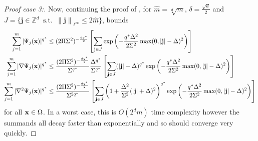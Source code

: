 \documentclass[10pt,a4paper,onecolumn]{article}
\numberwithin{equation}{section}
\let\F\mathds\let\C\mathcal\newcommand{\R}{\F{R}}\newcommand{\A}{\C{A}}
\newcommand{\norm}[1]{{\left\lVert #1 \right\rVert}}
\DeclareMathOperator{\st}{\;s.t.\;}\DeclareMathOperator{\as}{\;a.s.\;}\renewcommand{\epsilon}{\varepsilon}
\renewcommand{\vec}{\mathbf}
\newcommand{\UCmath}[1]{%
	\begingroup
	\ucmathlist\uppercase\expandafter{#1}%
	\endgroup
}
\newcommand{\ucmathlist}{%
	\def\alpha{\mathrm{A}}%
	\def\beta{\mathrm{B}}%
	\let\gamma=\Gamma
	\let\delta=\Delta
	\def\epsilon{\mathrm{E}}%
	\def\varepsilon{\mathrm{E}}%
	\def\zeta{\mathrm{Z}}%
	\def\eta{\mathrm{H}}%
	\let\theta=\Theta
	\let\vartheta=\Theta
	\def\iota{\mathrm{I}}%
	\def\kappa{\mathrm{K}}%
	\let\lambda=\Lambda
	\def\mu{\mathrm{M}}%
	\def\nu{\mathrm{N}}%
	\let\xi=\Xi
	\let\pi=\Pi
	\let\varpi=\Pi
	\def\rho{\mathrm{P}}%
	\def\varrho{\mathrm{P}}%
	\let\sigma=\Sigma
	\def\tau{\mathrm{T}}%
	\let\upsilon=\Upsilon
	\let\phi=\Phi
	\let\varphi=\Phi
	\def\chi{\mathrm{X}}%
	\let\psi=\Psi
	\let\omega=\Omega
}
\newcommand{\caps}[1]{\UCmath{#1}}
\newcommand*{\vard}[1]{%
	\IfEqCase{#1}{%
		{0}{\varphi}%
		{1}{\psi}%
	}[\varphi #1]%
}
\newcommand*{\varx}[1]{%
	\IfEqCase{#1}{%
		{0}{x}%
		{1}{y}%
		{2}{z}%
		{3}{r}%
	}[x#1]%
}
\newcommand{\Domain}{\Omega}
\newcommand*{\Varx}[1]{\caps{\varx{#1}}}
\newcommand*{\vvarx}[1]{\vec{\varx{#1}}}\newcommand*{\vVarx}[1]{\vec{\Varx{#1}}}
\begin{document}
\begin{proof}[Proof case 3:]
	Now, continuing the proof of , for $\hat m=\sqrt[d]{m}$, $\delta=\frac{\sqrt{d}}{2}$ and $J=\{\vec{j}\in\F Z^d \st \norm{\vec{j}}_{\ell^\infty}\leq 2\hat m\}$,  bounds 
	\begin{align*}
		\sum_{j=1}^m |\vard1_j(\vvarx0)|^{q^*} &\leq (2\pi\sigma^2)^{-\frac{dq^*}{2}} \left[\sum_{\vec{j}\in J} \exp\left(-\frac{q^*\Delta^2}{2\sigma^2}\max(0,|\vec{j}|-\delta)^2\right)\right]
		\\\sum_{j=1}^m |\nabla\vard1_j(\vvarx0)|^{q^*} &\leq \frac{(2\pi\sigma^2)^{-\frac{dq^*}{2}}}{\sigma^{q^*}}\frac{\Delta^{q^*}}{\sigma^{q^*}} \left[\sum_{\vec{j}\in J} (|\vec{j}|+\delta)^{q^*}\exp\left(-\frac{q^*\Delta^2}{2\sigma^2}\max(0,|\vec{j}|-\delta)^2\right)\right]
		\\\sum_{j=1}^m |\nabla^2\vard1_j(\vvarx0)|^{q^*} &\leq \frac{(2\pi\sigma^2)^{-\frac{dq^*}{2}}}{\sigma^{2q^*}} \left[\sum_{\vec{j}\in J} \left(1+\frac{\Delta^2}{\sigma^2}(|\vec{j}|+\delta)^2\right)^{q^*}\exp\left(-\frac{q^*\Delta^2}{2\sigma^2}\max(0,|\vec{j}|-\delta)^2\right)\right]
	\end{align*}
	for all $\vvarx0\in\Domain$. In a worst case, this is $O(2^dm)$ time complexity however the summands all decay faster than exponentially and so should converge very quickly.	
\end{proof}
\end{document}
